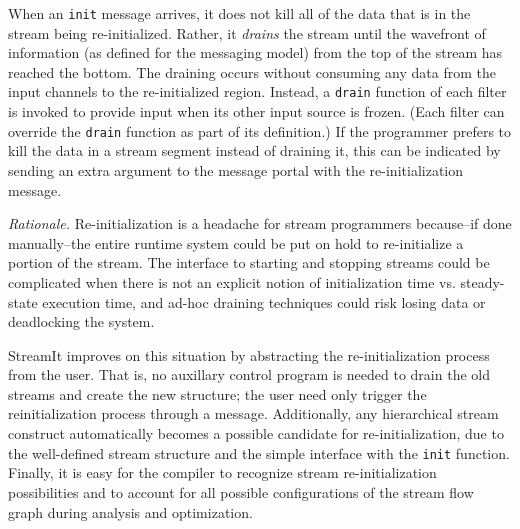 When an \texttt{init} message arrives, it does not kill all of the
data that is in the stream being re-initialized.  Rather, it
\emph{drains} the stream until the wavefront of information (as
defined for the messaging model) from the top of the stream has
reached the bottom.  The draining occurs without consuming any data
from the input channels to the re-initialized region.  Instead, a
\texttt{drain} function of each filter is invoked to provide input
when its other input source is frozen.  (Each filter can override the
\texttt{drain} function as part of its definition.)  If the programmer
prefers to kill the data in a stream segment instead of draining it,
this can be indicated by sending an extra argument to the message
portal with the re-initialization message.

\emph{Rationale.}  Re-initialization is a headache for stream
programmers because--if done manually--the entire runtime system could
be put on hold to re-initialize a portion of the stream.  The
interface to starting and stopping streams could be complicated when
there is not an explicit notion of initialization time vs.
steady-state execution time, and ad-hoc draining techniques could risk
losing data or deadlocking the system.

StreamIt improves on this situation by abstracting the
re-initialization process from the user.  That is, no auxillary
control program is needed to drain the old streams and create the new
structure; the user need only trigger the reinitialization process
through a message.  Additionally, any hierarchical stream construct
automatically becomes a possible candidate for re-initialization, due
to the well-defined stream structure and the simple interface with the
\texttt{init} function.  Finally, it is easy for the compiler to
recognize stream re-initialization possibilities and to account for
all possible configurations of the stream flow graph during analysis
and optimization.



